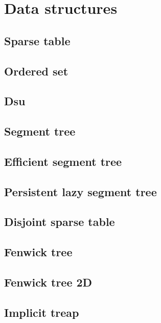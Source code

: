 \section{Data structures}

\subsection{Sparse table}

\subsection{Ordered set}

\subsection{Dsu}

\subsection{Segment tree}

\subsection{Efficient segment tree}

\subsection{Persistent lazy segment tree}

\subsection{Disjoint sparse table}

\subsection{Fenwick tree}

\subsection{Fenwick tree 2D}

\subsection{Implicit treap}
